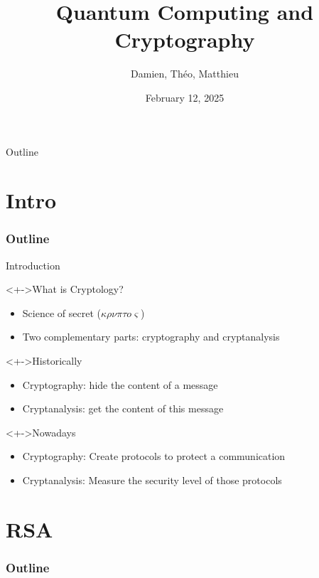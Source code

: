 \documentclass{beamer}
\title{Quantum Computing and Cryptography}
\author{Damien, Théo, Matthieu}
\institute{}
\date{February 12, 2025}
\begin{document}
\begin{frame}
\maketitle
\end{frame}

\begin{frame}{Outline}
\tableofcontents
\end{frame}

\section{Intro}
\begin{frame}
  \frametitle{Outline}
  \tableofcontents[currentsection]
\end{frame}

\begin{frame}{Introduction}
\begin{linenumbers}
	\begin{block}<+->{What is Cryptology?}
		\begin{itemize}
			\item Science of secret ($\kappa\rho\nu\pi\tau o\varsigma$) %
			\item Two complementary parts: cryptography and cryptanalysis
		\end{itemize}
	\end{block}
	\begin{block}<+->{Historically}
		\begin{itemize}
			\item Cryptography: hide the content of a message
			\item Cryptanalysis: get the content of this message
		\end{itemize}
	\end{block}
	\begin{block}<+->{Nowadays}
		\begin{itemize}
			\item Cryptography: Create protocols to protect a communication
			\item Cryptanalysis: Measure the security level of those protocols
		\end{itemize}
	\end{block}
\end{linenumbers}
\end{frame}

\section{RSA}
\begin{frame}
  \frametitle{Outline}
  \tableofcontents[currentsection]
\end{frame}
\end{document}
